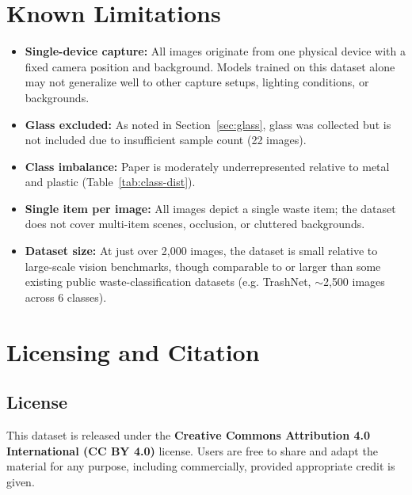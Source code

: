 \documentclass[11pt]{article}
\begin{document}

\section{Known Limitations}

\begin{itemize}
    \item \textbf{Single-device capture:} All images originate from one physical device with a fixed camera position and background. Models trained on this dataset alone may not generalize well to other capture setups, lighting conditions, or backgrounds.
    \item \textbf{Glass excluded:} As noted in Section~\ref{sec:glass}, glass was collected but is not included due to insufficient sample count (22 images).
    \item \textbf{Class imbalance:} Paper is moderately underrepresented relative to metal and plastic (Table~\ref{tab:class-dist}).
    \item \textbf{Single item per image:} All images depict a single waste item; the dataset does not cover multi-item scenes, occlusion, or cluttered backgrounds.
    \item \textbf{Dataset size:} At just over 2{,}000 images, the dataset is small relative to large-scale vision benchmarks, though comparable to or larger than some existing public waste-classification datasets (e.g. TrashNet, $\sim$2{,}500 images across 6 classes).
\end{itemize}
\label{sec:glass}

\section{Licensing and Citation}


\subsection{License}
This dataset is released under the \textbf{Creative Commons Attribution 4.0 International (CC BY 4.0)} license. Users are free to share and adapt the material for any purpose, including commercially, provided appropriate credit is given.
\end{document}
